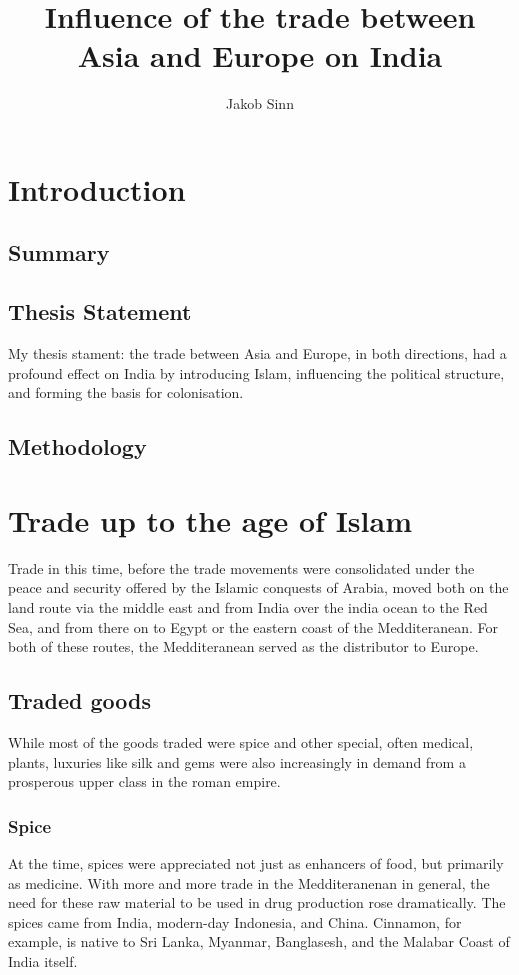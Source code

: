 \documentclass[11pt, a4paper]{scrreprt}
\begin{document}
\renewcommand{\baselinestretch}{1.5}
\subject{Facharbeit}
\author{Jakob Sinn}
\title{Influence of the trade between \\ Asia and Europe on India}
\maketitle
\tableofcontents
{}
\chapter{Introduction}
\section{Summary}

\section{Thesis Statement}
My thesis stament: the trade between Asia and Europe, in both directions, had a profound effect on India by introducing Islam, influencing the political structure, and forming the basis for colonisation.
\section{Methodology}
 
\chapter{Trade up to the age of Islam}
Trade in this time, before the trade movements were consolidated under the peace and security offered by the Islamic conquests of Arabia, moved both on the land route via the middle east and from India over the india ocean to the Red Sea, and from there on to Egypt or the eastern coast of the Medditeranean. For both of these routes, the Medditeranean served as the distributor to Europe.

\section{Traded goods}
While most of the goods traded were spice and other special, often medical, plants, luxuries like silk and gems were also increasingly in demand from a prosperous upper class in the roman empire.
\subsection{Spice}
At the time, spices were appreciated not just as enhancers of food, but primarily as medicine\autocite{MST}. With more and more trade in the Medditeranenan in general, the need for these raw material to be used in drug production rose dramatically.
The spices came from India, modern-day Indonesia, and China. Cinnamon, for example, is native to Sri Lanka, Myanmar, Banglasesh, and the Malabar Coast of India itself\autocite{Cinnamon}.
\end{document}
